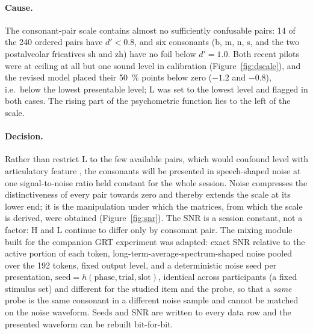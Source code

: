 \documentclass[man,12pt,floatsintext,natbib]{apa7}
\begin{document}
\paragraph{Cause.} The consonant-pair scale contains almost no sufficiently confusable pairs: 14 of the 240 ordered pairs have $d' < 0.8$, and six consonants (b, m, n, s, and the two postalveolar fricatives sh and zh) have no foil below $d' = 1.0$. Both recent pilots were at ceiling at all but one sound level in calibration (Figure~\ref{fig:dscale}), and the revised model placed their \SI{50}{\percent} points below zero ($-1.2$ and $-0.8$), i.e.\ below the lowest presentable level; L was set to the lowest level and flagged in both cases. The rising part of the psychometric function lies to the left of the scale.

\paragraph{Decision.} Rather than restrict L to the few available pairs, which would confound level with articulatory feature \citep[place pairs only; cf.][]{millernicely1955}, the consonants will be presented in speech-shaped noise at one signal-to-noise ratio held constant for the whole session. Noise compresses the distinctiveness of every pair towards zero and thereby extends the scale at its lower end; it is the manipulation under which the \citet{millernicely1955} matrices, from which the scale is derived, were obtained (Figure~\ref{fig:snr}). The SNR is a session constant, not a factor: H and L continue to differ only by consonant pair. The mixing module built for the companion GRT experiment was adapted: exact SNR relative to the active portion of each token, long-term-average-spectrum-shaped noise pooled over the 192 tokens, fixed output level, and a deterministic noise seed per presentation, $\text{seed} = h(\text{phase}, \text{trial}, \text{slot})$, identical across participants (a fixed stimulus set) and different for the studied item and the probe, so that a \emph{same} probe is the same consonant in a different noise sample and cannot be matched on the noise waveform. Seeds and SNR are written to every data row and the presented waveform can be rebuilt bit-for-bit.
\end{document}
